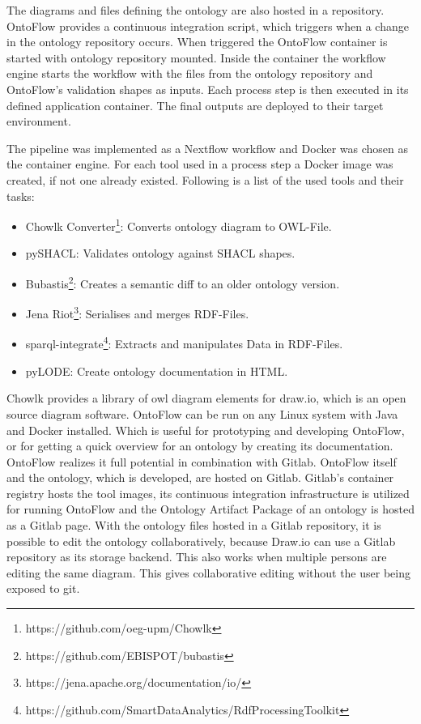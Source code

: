 \documentclass[sigconf]{acmart}
\begin{document}
The diagrams and files defining the ontology are also hosted in a repository.
OntoFlow provides a continuous integration script, which triggers when a change in the ontology repository occurs.
When triggered the OntoFlow container is started with ontology repository mounted.
Inside the container the workflow engine starts the workflow with the files from the ontology repository and OntoFlow's validation shapes as inputs.
Each process step is then executed in its defined application container.
The final outputs are deployed to their target environment.


The pipeline was implemented as a Nextflow workflow and Docker was chosen as the container engine.
For each tool used in a process step a Docker image was created, if not one already existed.
Following is a list of the used tools and their tasks:

\begin{itemize}
  \item Chowlk Converter\footnote{https://github.com/oeg-upm/Chowlk}: Converts ontology diagram to OWL-File.
  \item pySHACL: Validates ontology against SHACL shapes.
  \item Bubastis\footnote{https://github.com/EBISPOT/bubastis}: Creates a semantic diff to an older ontology version.
  \item Jena Riot\footnote{https://jena.apache.org/documentation/io/}: Serialises and merges RDF-Files.
  \item sparql-integrate\footnote{https://github.com/SmartDataAnalytics/RdfProcessingToolkit}: Extracts and manipulates Data in RDF-Files.
  \item pyLODE: Create ontology documentation in HTML.
\end{itemize}

Chowlk provides a library of owl diagram elements for draw.io, which is an open source diagram software.
OntoFlow can be run on any Linux system with Java and Docker installed.
Which is useful for prototyping and developing OntoFlow, or for getting a quick overview for an ontology by creating its documentation.
OntoFlow realizes it full potential in combination with Gitlab.
OntoFlow itself and the ontology, which is developed, are hosted on Gitlab.
Gitlab's container registry hosts the tool images, its continuous integration infrastructure is utilized for running OntoFlow and the Ontology Artifact Package of an ontology is hosted as a Gitlab page.
With the ontology files hosted in a Gitlab repository, it is possible to edit the ontology collaboratively, because Draw.io can use a Gitlab repository as its storage backend.
This also works when multiple persons are editing the same diagram.
This gives collaborative editing without the user being exposed to git.
\end{document}
